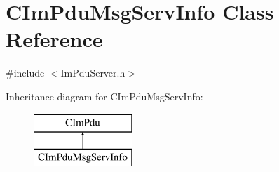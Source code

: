 \hypertarget{class_c_im_pdu_msg_serv_info}{}\section{C\+Im\+Pdu\+Msg\+Serv\+Info Class Reference}
\label{class_c_im_pdu_msg_serv_info}


{\ttfamily \#include $<$Im\+Pdu\+Server.\+h$>$}

Inheritance diagram for C\+Im\+Pdu\+Msg\+Serv\+Info\+:\begin{figure}[H]
\begin{center}
\leavevmode
\includegraphics[height=2.000000cm]{class_c_im_pdu_msg_serv_info}
\end{center}
\end{figure}
